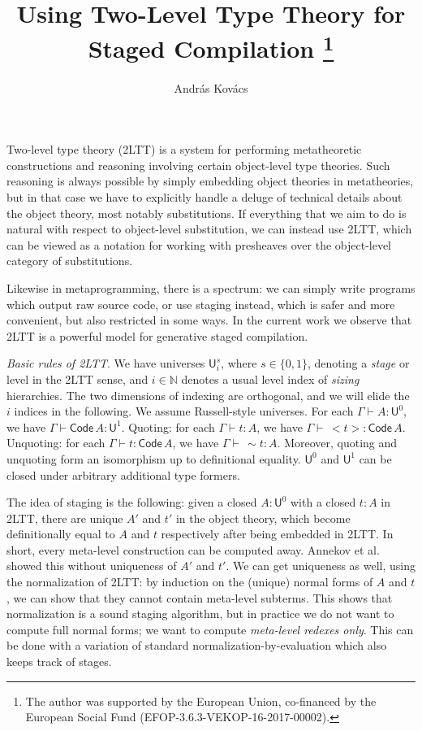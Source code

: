\documentclass{easychair}
\title{Using Two-Level Type Theory for Staged Compilation %
  \thanks{The author was supported by the European Union, co-financed
    by the European Social Fund (EFOP-3.6.3-VEKOP-16-2017-00002).}}
\author{
Andr\'as Kov\'acs
}
\institute{
  E\"otv\"os Lor\'and University,
  Budapest, Hungary \\
  \email{kovacsandras@inf.elte.hu}
}
\newcommand{\U}{\mathsf{U}}
\newcommand{\Code}{\mathsf{Code}}
\begin{document}
\maketitle

Two-level type theory \cite{twolevel} (2LTT) is a system for performing
metatheoretic constructions and reasoning involving certain object-level type
theories. Such reasoning is always possible by simply embedding object theories
in metatheories, but in that case we have to explicitly handle a deluge of
technical details about the object theory, most notably substitutions. If
everything that we aim to do is natural with respect to object-level
substitution, we can instead use 2LTT, which can be viewed as a notation for
working with presheaves over the object-level category of substitutions.

Likewise in metaprogramming, there is a spectrum: we can simply write programs
which output raw source code, or use staging instead, which is safer and more
convenient, but also restricted in some ways. In the current work we observe
that 2LTT is a powerful model for generative staged compilation.

\emph{Basic rules of 2LTT}. We have universes $\U^s_{i}$, where $s \in \{0,1\}$,
denoting a \emph{stage} or level in the 2LTT sense, and $i \in \mathbb{N}$
denotes a usual level index of \emph{sizing} hierarchies. The two dimensions of
indexing are orthogonal, and we will elide the $i$ indices in the following. We
assume Russell-style universes. For each $\Gamma \vdash A : \U^0$, we have
$\Gamma \vdash \Code\,A : \U^1$. Quoting: for each $\Gamma \vdash t : A$, we
have $\Gamma \vdash\,<\!t\!> : \Code\,A$. Unquoting: for each $\Gamma \vdash t :
\Code\,A$, we have $\Gamma \vdash\,\sim\!t : A$. Moreover, quoting and unquoting
form an isomorphism up to definitional equality. $\U^0$ and $\U^1$ can be closed
under arbitrary additional type formers.

The idea of staging is the following: given a closed $A : \U^0$ with a closed $t
: A$ in 2LTT, there are unique $A'$ and $t'$ in the object theory, which become
definitionally equal to $A$ and $t$ respectively after being embedded in
2LTT. In short, every meta-level construction can be computed away. Annekov et
al. \cite{twolevel} showed this without uniqueness of $A'$ and $t'$. We can get
uniqueness as well, using the normalization of 2LTT: by induction on the
(unique) normal forms of $A$ and $t$, we can show that they cannot contain
meta-level subterms. This shows that normalization is a sound staging algorithm,
but in practice we do not want to compute full normal forms; we want to compute
\emph{meta-level redexes only}. This can be done with a variation of standard
normalization-by-evaluation \cite{abel2013normalization,
  Wieczorek:2018:CFN:3176245.3167091} which also keeps track of stages.
\end{document}
